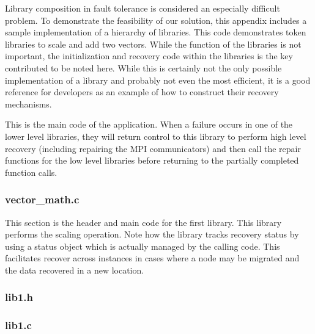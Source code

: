 \label{appdx:library}

Library composition in fault tolerance is considered an especially difficult 
problem. To demonstrate the feasibility of our solution, this appendix includes a 
sample implementation of a hierarchy of libraries. This code demonstrates token 
libraries to scale and add two vectors. While the function of the libraries is 
not important, the initialization and recovery code within the libraries is the 
key contributed to be noted here. While this is certainly not the only possible 
implementation of a library and probably not even the most efficient, it is a 
good reference for developers as an example of how to construct their recovery 
mechanisms.


This is the main code of the application. When a failure occurs in one of the 
lower level libraries, they will return control to this library to perform high 
level recovery (including repairing the MPI communicators) and then call the 
repair functions for the low level libraries before returning to the partially 
completed function calls.

\subsubsection*{vector_math.c}




This section is the header and main code for the first library. This library 
performs the scaling operation. Note how the library tracks recovery status by 
using a status object which is actually managed by the calling code. This 
facilitates recover across instances in cases where a node may be migrated and 
the data recovered in a new location.

\subsubsection*{lib1.h}



\subsubsection*{lib1.c}

